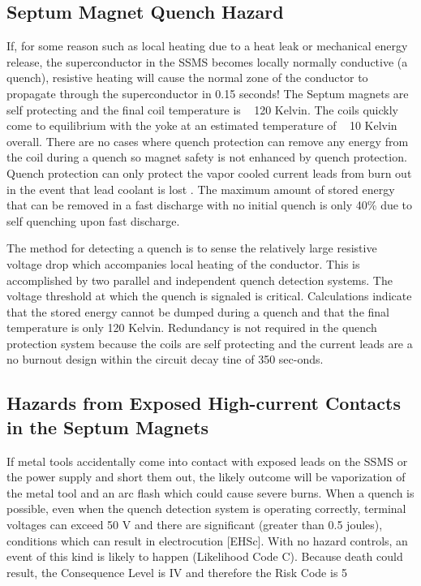 {\begin{safetyen}{10}{15}
\subsection {\bf Septum Magnet Quench Hazard}
\end{safetyen}
If, for some reason such as local heating due to a heat leak or mechanical energy release, the superconductor 
in the SSMS becomes locally normally conductive (a quench), resistive heating will cause the normal zone of 
the conductor to propagate through the superconductor in 0.15 seconds! The Septum magnets are self protecting 
and the final coil temperature is ~ 120 Kelvin. The coils quickly come to equilibrium with the yoke at an 
estimated temperature of ~ 10 Kelvin overall. There are no cases where quench protection can remove any energy 
from the coil during a quench so magnet safety is not enhanced by quench protection. Quench protection can only 
protect the vapor cooled current leads from burn out in the event that lead coolant is lost . The maximum amount 
of stored energy that can be removed in a fast discharge with no initial quench is only 40\% due to self 
quenching upon fast discharge.

The method for detecting a quench is to sense the relatively large resistive 
voltage drop which accompanies local heating of the conductor.  This is accomplished by two parallel and 
independent quench detection systems.  The voltage threshold at which the quench is signaled is critical.  
Calculations indicate that  the stored energy cannot be dumped during a quench and that the final temperature 
is only 120 Kelvin. Redundancy is not required in the quench protection system because the coils are self 
protecting and the current leads are a no burnout design within the circuit decay tine of 350 sec-onds.


\begin{safetyen}{10}{15}
\subsection {\bf Hazards from Exposed High-current Contacts in the Septum Magnets}
\end{safetyen}

If metal tools accidentally come into contact with exposed leads on the SSMS or the power supply and short 
them out, the likely outcome will be vaporization of the metal tool and an arc flash which could cause 
severe burns.  When a quench is possible, even when the quench detection system is operating correctly, 
terminal voltages can exceed 50 V and there are significant (greater than 0.5 joules), conditions which 
can result in 
electrocution [EHSc].  With no hazard controls, an event of this kind is likely to happen (Likelihood Code C).  
Because death could result, the Consequence Level is IV and therefore the Risk Code is 5

}
